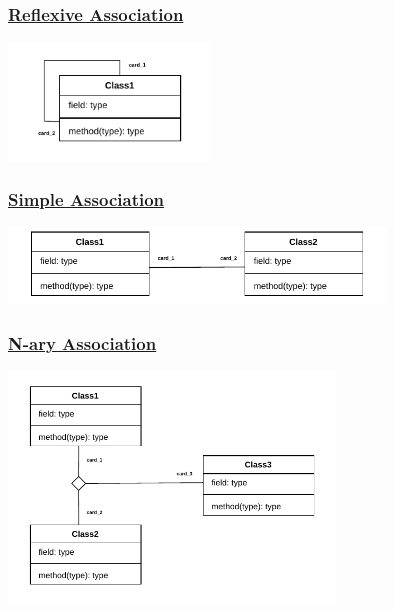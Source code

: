 \subsubsection*{\underline{Reflexive Association}}
\begin{center}
    \includegraphics[width=0.4\textwidth]{Chapters/Diagram/OOP/Sum/reflexiveAssoc/selfassoc.drawio.pdf}
\end{center}

\subsubsection*{\underline{Simple Association}}

\begin{center}
   \includegraphics[width=0.75\textwidth]{Chapters/Diagram/OOP/Sum/SAssoc/simpleassoc.drawio.pdf}
\end{center}

\subsubsection*{\underline{N-ary Association}}

\begin{center}
\includegraphics[width=0.65\textwidth]{Chapters/Diagram/OOP/Sum/NaryAssoc/naryassoc.drawio.pdf}
\end{center}

